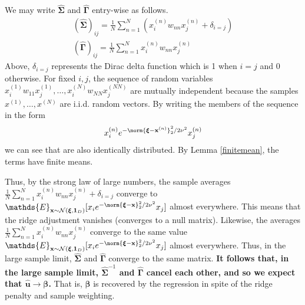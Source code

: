 \documentclass[mnsc,blindrev]{informs3}
\newcommand{\bx}{\mathbf{x}}
\newcommand{\bu}{\mathbf{u}}
\newcommand{\bxi}{\boldsymbol{\xi}}
\newcommand{\bS}{\boldsymbol{\Sigma}}
\newcommand{\bG}{\boldsymbol{\Gamma}}
\begin{document}
    We may write $\hat{\bS}$ and $\hat{\bG}$ entry-wise as follows.
    \begin{gather*}
        (\hat{\bS})_{ij} = \frac{1}{N}\sum_{n=1}^N( x_i^{(n)} w_{nn} x_j^{(n)} + \delta_{i=j}) \\
        (\hat{\bG})_{ij} = \frac{1}{N} \sum_{n=1}^N x_i^{(n)} w_{nn} x_j^{(n)} 
    \end{gather*}
    Above, $\delta_{i=j}$ represents the Dirac delta function which is 1 when $i=j$ and 0 otherwise. For fixed $i,j$, the sequence of random variables $x_i^{(1)} w_{11} x_j^{(1)},\ldots,x_i^{(N)} w_{NN} x_j^{(NN)}$ are mutually independent because the samples $x^{(1)},\ldots,x^{(N)}$ are i.i.d. random vectors. 
    By writing the members of the sequence in the form
    \begin{equation*}   
        x_i^{(n)} e^{-\norm{\bxi - \bx^{(n)}}_2^2/2\nu^2} x_j^{(n)}
    \end{equation*}
    we can see that are also identically distributed. %
    By Lemma \ref{finitemean}, the terms have finite means. 
    
    Thus, by the strong law of large numbers, the sample averages $\frac{1}{N}\sum_{n=1}^N x_i^{(n)} w_{nn} x_j^{(n)}+\delta_{i=j}$ converge to $\mathds{E}_{\bx \sim \mathcal{N}(\bxi,\mathbf{1}_{D})}[x_i e^{-\norm{\bxi-\bx}_2^2/2\nu^2}x_j]$ almost everywhere. This means that the ridge adjustment vanishes (converges to a null matrix). Likewise, the averages $\frac{1}{N}\sum_{n=1}^N x_i^{(n)} w_{nn} x_j^{(n)}$ converge to the same value $\mathds{E}_{\bx \sim \mathcal{N}(\bxi,\mathbf{1}_{D})}[x_i e^{-\norm{\bxi-\bx}_2^2/2\nu^2}x_j]$ almost everywhere. Thus, in the large sample limit, $\hat{\bS}$ and $\hat{\bG}$ converge to the same matrix. \textbf{It follows that, in the large sample limit, $\hat{\bS}^{-1}$ and $\hat{\bG}$ cancel each other, and so we expect that $\hat{\bu} \rightarrow \boldsymbol{\beta}$.} That is, $\boldsymbol{\beta}$ is recovered by the regression in spite of the ridge penalty and sample weighting. 
    
    
    
    
\end{document}
